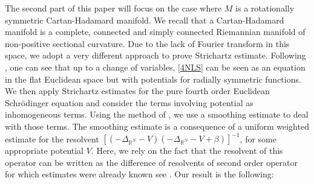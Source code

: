 \documentclass[10pt,leqno]{amsart}
\numberwithin{equation}{section}
\newcommand{\field}[1]{\mathbb{#1}}
\newcommand{\R}{\field{R}}          		%
\begin{document}
The second part of this paper will focus on the case where $M$ is a rotationally symmetric Cartan-Hadamard manifold. We recall that a Cartan-Hadamard manifold is a complete, connected and simply connected Riemannian manifold of non-positive sectional curvature. Due to the lack of Fourier transform in this space, we adopt a very different approach to prove Strichartz estimate. Following \cite{BaDyweight}, one can see that up to a change of variables, \eqref{4NLS} can be seen as an equation in the flat Euclidean space but with potentials for radially symmetric functions. We then apply Strichartz estimates for the pure fourth order Euclidean Schr\" odinger equation and consider the terms involving potential as inhomogeneous terms. Using the method of \cite{BaDyweight}, we use a smoothing estimate to deal with those terms. The smoothing estimate is a consequence of a uniform weighted estimate for the resolvent $[(-\Delta_{\R^N} - V)(-\Delta_{\R^N} -V +\beta)]^{-1}$, for some appropriate potential $V$. Here, we rely on the fact that the resolvent of this operator can be written as the difference of resolvents of second order operator for which estimates were already known see \cite{BPST}. Our result is the following:
\end{document}
